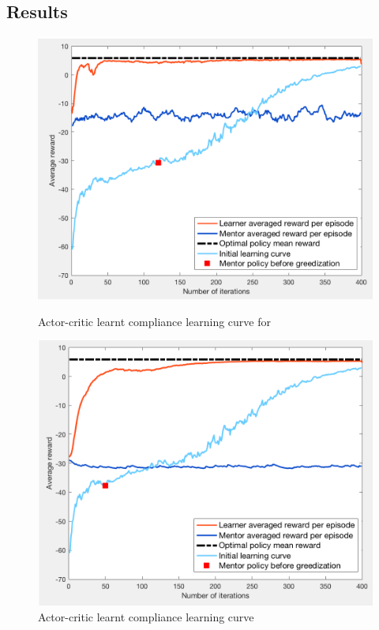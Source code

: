 \documentclass[a4paper]{report}
\begin{document}
{{{			\subsection{Results}
			{				 
				 \begin{figure}[ht!]
					\begin{minipage}{0.5\linewidth}
						\begin{center}
							\includegraphics[width=0.95\linewidth]{av_il_subopt_120}
							\caption{Actor-critic learnt compliance learning curve for }
							\label{fig::av_il_subopt_120}
						\end{center}
					\end{minipage}
					\begin{minipage}{0.5\linewidth}
						\begin{center}
							\includegraphics[width=0.95\linewidth]{av_il_subopt_50}
							\caption{Actor-critic learnt compliance learning curve}
							\label{fig::av_il_subopt_50}
						\end{center}
					\end{minipage}
				\end{figure}
				
}}}}
\end{document}
